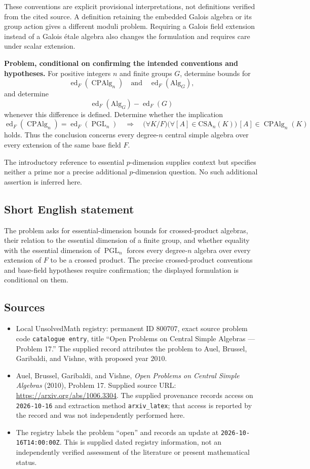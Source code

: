 \documentclass[11pt]{article}
\begin{document}
These conventions are explicit provisional interpretations, not definitions verified from the cited source. A definition retaining the embedded Galois algebra or its group action gives a different moduli problem. Requiring a Galois field extension instead of a Galois étale algebra also changes the formulation and requires care under scalar extension.

\textbf{Problem, conditional on confirming the intended conventions and hypotheses.} For positive integers \(n\) and finite groups \(G\), determine bounds for
\[
\operatorname{ed}_F(\operatorname{CPAlg}_n)
\quad\text{and}\quad
\operatorname{ed}_F(\mathrm{Alg}_G),
\]
and determine
\[
\operatorname{ed}_F(\mathrm{Alg}_G)-\operatorname{ed}_F(G)
\]
whenever this difference is defined. Determine whether the implication
\[
\operatorname{ed}_F(\operatorname{CPAlg}_n)
 =\operatorname{ed}_F(\operatorname{PGL}_n)
\quad\Longrightarrow\quad
\bigl(\forall K/F\bigr)\bigl(\forall[A]\in\mathrm{CSA}_n(K)\bigr)\,
[A]\in\operatorname{CPAlg}_n(K)
\]
holds. Thus the conclusion concerns every degree-\(n\) central simple algebra over every extension of the same base field \(F\).

The introductory reference to essential \(p\)-dimension supplies context but specifies neither a prime nor a precise additional \(p\)-dimension question. No such additional assertion is inferred here.
\subsection{Short English statement}
The problem asks for essential-dimension bounds for crossed-product algebras, their relation to the essential dimension of a finite group, and whether equality with the essential dimension of \(\operatorname{PGL}_n\) forces every degree-\(n\) algebra over every extension of \(F\) to be a crossed product. The precise crossed-product conventions and base-field hypotheses require confirmation; the displayed formulation is conditional on them.
\subsection{Sources}
\begin{itemize}
\item Local UnsolvedMath registry: permanent ID \(800707\), exact source problem code \texttt{catalogue entry}, title ``Open Problems on Central Simple Algebras --- Problem 17.'' The supplied record attributes the problem to Auel, Brussel, Garibaldi, and Vishne, with proposed year \(2010\).
\item Auel, Brussel, Garibaldi, and Vishne, \emph{Open Problems on Central Simple Algebras} (2010), Problem 17. Supplied source URL: \url{https://arxiv.org/abs/1006.3304}. The supplied provenance records access on \texttt{2026-10-16} and extraction method \texttt{arxiv\_latex}; that access is reported by the record and was not independently performed here.
\item The registry labels the problem ``open'' and records an update at \texttt{2026-10-16T14:00:00Z}. This is supplied dated registry information, not an independently verified assessment of the literature or present mathematical status.
\end{itemize}
\end{document}
